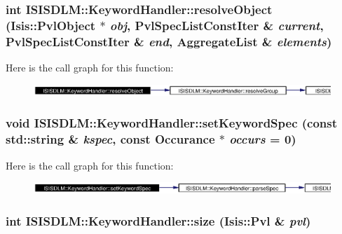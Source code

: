 \subsubsection{\setlength{\rightskip}{0pt plus 5cm}int ISISDLM::Keyword\-Handler::resolve\-Object (Isis::Pvl\-Object $\ast$ {\em obj}, {\bf Pvl\-Spec\-List\-Const\-Iter} \& {\em current}, {\bf Pvl\-Spec\-List\-Const\-Iter} \& {\em end}, {\bf Aggregate\-List} \& {\em elements})\hspace{0.3cm}{\tt  [private]}}\label{classISISDLM_1_1KeywordHandler_d3}




Here is the call graph for this function:\begin{figure}[H]
\begin{center}
\leavevmode
\includegraphics[width=394pt]{classISISDLM_1_1KeywordHandler_d3_cgraph}
\end{center}
\end{figure}
\subsubsection{\setlength{\rightskip}{0pt plus 5cm}void ISISDLM::Keyword\-Handler::set\-Keyword\-Spec (const std::string \& {\em kspec}, const {\bf Occurance} $\ast$ {\em occurs} = 0)}\label{classISISDLM_1_1KeywordHandler_a3}




Here is the call graph for this function:\begin{figure}[H]
\begin{center}
\leavevmode
\includegraphics[width=386pt]{classISISDLM_1_1KeywordHandler_a3_cgraph}
\end{center}
\end{figure}
\subsubsection{\setlength{\rightskip}{0pt plus 5cm}int ISISDLM::Keyword\-Handler::size (Isis::Pvl \& {\em pvl})}\label{classISISDLM_1_1KeywordHandler_a5}




